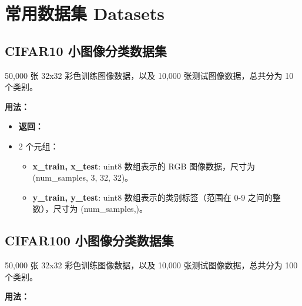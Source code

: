 
\section{常用数据集 Datasets}\label{datasets}

\subsection{CIFAR10
小图像分类数据集}\label{cifar10-ux5c0fux56feux50cfux5206ux7c7bux6570ux636eux96c6}

50,000 张 32x32 彩色训练图像数据，以及 10,000 张测试图像数据，总共分为
10 个类别。

\textbf{用法：}\label{ux7528ux6cd5}

\begin{Shaded}
\begin{Highlighting}[]
  

\OperatorTok{=} 
\end{Highlighting}
\end{Shaded}

\begin{itemize}
\tightlist
\item
  \textbf{返回：}
\item
  2 个元组：

  \begin{itemize}
  \tightlist
  \item
    \textbf{x\_train, x\_test}: uint8 数组表示的 RGB 图像数据，尺寸为
    (num\_samples, 3, 32, 32)。
  \item
    \textbf{y\_train, y\_test}: uint8 数组表示的类别标签（范围在 0-9
    之间的整数），尺寸为 (num\_samples,)。
  \end{itemize}
\end{itemize}


\subsection{CIFAR100
小图像分类数据集}\label{cifar100-ux5c0fux56feux50cfux5206ux7c7bux6570ux636eux96c6}

50,000 张 32x32 彩色训练图像数据，以及 10,000 张测试图像数据，总共分为
100 个类别。

\textbf{用法：}\label{ux7528ux6cd5-1}

\begin{Shaded}
\begin{Highlighting}[]
  

\OperatorTok{=} \OperatorTok{=}\NormalTok{)}
\end{Highlighting}
\end{Shaded}

